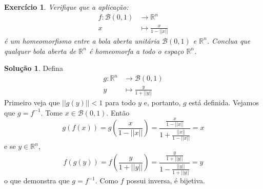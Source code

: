 \documentclass[a4paper,12pt]{article}
\newcommand{\R}{\mathbb{R}}
\newcommand{\B}{\mathcal{B}}
\theoremstyle{exer}
\newtheorem{exercise}{Exercício}
\theoremstyle{definition}
\newtheorem{solution}{Solução}
\theoremstyle{plain}
\begin{document}
\begin{exercise}
    Verifique que a aplicação:
    \begin{align*}
        f : \B(0, 1) &\to \R^n \\
        x &\mapsto \frac{x}{1 - ||x||}        
    \end{align*}
    é um homeomorfismo entre a bola aberta unitária $\B(0, 1)$ e $\R^n$.
    Conclua que qualquer bola aberta de $\R^n$ é homeomorfa a todo o espaço $\R^n$.
\end{exercise}

\begin{solution}
    Defina 
    \begin{align*}
        g : \R^n &\to \B(0,1) \\
        y&\mapsto \frac{y}{1 + ||y||} 
    \end{align*}
    Primeiro veja que $||g(y)|| < 1$ para todo $y$ e, portanto, $g$ está
    definida. Vejamos que $g = f^{-1}$. Tome $x \in \B(0,1)$. Então
    $$
    g(f(x)) = g\left(\frac{x}{1-||x||}\right) = \frac{\frac{x}{1 - ||x||}}{1 + \frac{||x||}{1 - ||x||}} = x
    $$
    e se $y \in \R^n$,
    $$
    f(g(y)) = f\left(\frac{y}{1 + ||y||}\right) = \frac{\frac{y}{1+||y||}}{1-\frac{||y||}{1+||y||}} = y
    $$
    o que demonstra que $g = f^{-1}$. Como $f$ possui inversa, é bijetiva. 


\end{solution}
\end{document}
